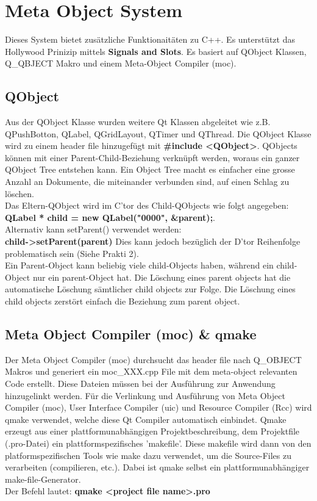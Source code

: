 \section{Meta Object System} 
Dieses System bietet zusätzliche Funktionaitäten zu C++. Es unterstützt das Hollywood Prinizip mittels \textbf{Signals and Slots}. Es basiert auf QObject Klassen, Q\_QBJECT Makro und einem Meta-Object Compiler (moc). 

\subsection{QObject}
Aus der QObject Klasse wurden weitere Qt Klassen abgeleitet wie z.B. QPushBotton, QLabel, QGridLayout, QTimer und QThread. Die QObject Klasse wird zu einem header file hinzugefügt mit \textbf{\#include <QObject>}. QObjects können mit einer Parent-Child-Beziehung verknüpft werden, woraus ein ganzer QObject Tree entstehen kann. Ein Object Tree macht es einfacher eine grosse Anzahl an Dokumente, die miteinander verbunden sind, auf einen Schlag zu löschen. \\
Das Eltern-QObject wird im C'tor des Child-QObjects wie folgt angegeben:\\ 
\textbf{QLabel * child = new QLabel("0000", \&parent);}.\\
Alternativ kann setParent() verwendet werden: \\
\textbf{child->setParent(parent)}
Dies kann jedoch bezüglich der D'tor Reihenfolge problematisch sein (Siehe Prakti 2). \\
Ein Parent-Object kann beliebig viele child-Objects haben, während ein child-Object nur ein parent-Object hat. Die Löschung eines parent objects hat die automatische Löschung sämtlicher child objects zur Folge. Die Löschung eines child objects zerstört einfach die Beziehung zum parent object. 

\subsection{Meta Object Compiler (moc) \& qmake}
Der Meta Object Compiler (moc) durchsucht das header file nach Q\_OBJECT Makros und generiert ein moc\_XXX.cpp File mit dem meta-object relevanten Code erstellt. Diese Dateien müssen bei der Ausführung zur Anwendung hinzugelinkt werden. Für die Verlinkung und Ausführung von Meta Object Compiler (moc), User Interface Compiler (uic) und Resource Compiler (Rcc) wird qmake verwendet, welche diese Qt Compiler automatisch einbindet. Qmake erzeugt aus einer plattformunabhängigen Projektbeschreibung, dem Projektfile (.pro-Datei) ein plattformspezifisches 'makefile'. Diese makefile wird dann von den platformspezifischen Tools wie make dazu verwendet, um die Source-Files zu verarbeiten (compilieren, etc.). Dabei ist qmake selbst ein plattformunabhängiger make-file-Generator. \\Der Befehl lautet: \textbf{qmake <project file name>.pro} 

